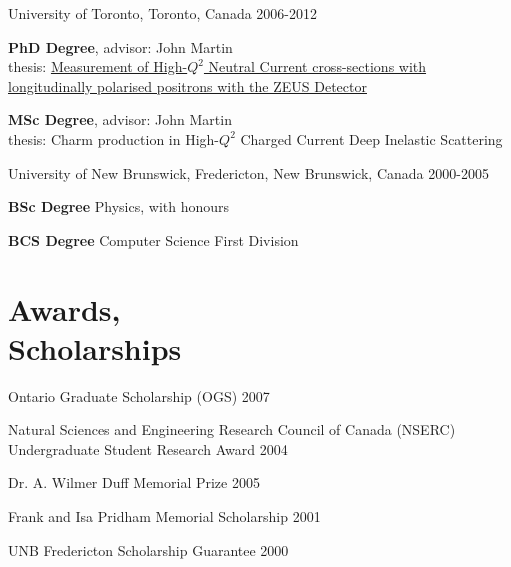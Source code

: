 \documentclass[margin,line]{resume}
\begin{document}
\begin{resume}
    University of Toronto, Toronto, Canada \hfill {2006-2012}\\
    \begin{list2}
      \vspace*{-4mm}
    \item \textbf{PhD Degree}, advisor: John Martin\\
      thesis: \href{https://tspace.library.utoronto.ca/bitstream/1807/34931/1/Trevor_Stewart_P_201211_PhD_thesis.pdf}{Measurement of High-$Q^2$ Neutral Current cross-sections with longitudinally polarised positrons with the ZEUS Detector}
    \item \textbf{MSc Degree}, advisor: John Martin\\
      thesis: Charm production in High-$Q^2$ Charged Current Deep Inelastic Scattering
    \end{list2}
    University of New Brunswick, Fredericton, New Brunswick, Canada \hfill {2000-2005}\\
    \begin{list2}
      \vspace*{-4mm}
    \item \textbf{BSc Degree} Physics, with honours
    \item \textbf{BCS Degree} Computer Science First Division
    \end{list2}



    \section{\mysidestyle Awards,\\Scholarships\\}
    \begin{list2}
    \item Ontario Graduate Scholarship (OGS) \hfill{2007}
    \item Natural Sciences and Engineering Research Council of Canada (NSERC)\\ Undergraduate Student Research Award \hfill{2004}
    \item Dr. A. Wilmer Duff Memorial Prize \hfill{2005}
    \item Frank and  Isa  Pridham Memorial Scholarship \hfill{2001}
    \item UNB Fredericton Scholarship Guarantee \hfill {2000}
    \end{list2}


\end{resume}
\end{document}
